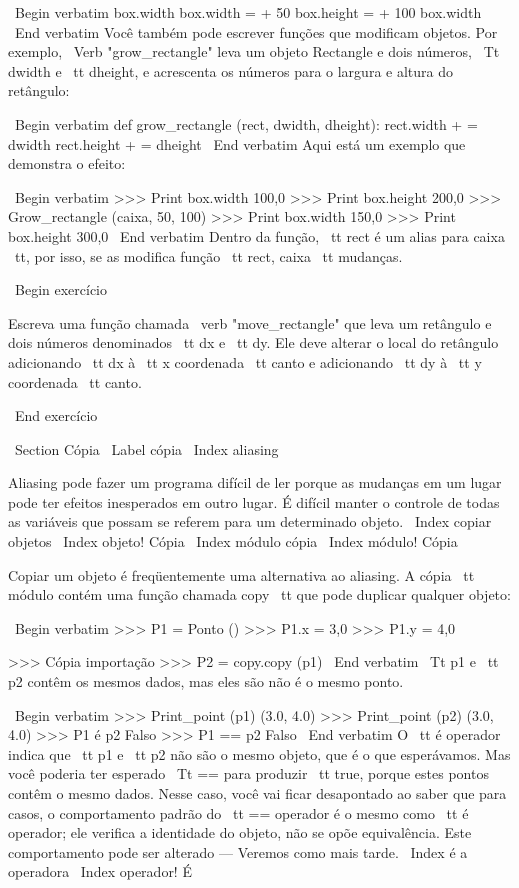 \documentclass[10pt]{book}
\begin{document}
{{{{{{{{{{{{{\ Begin {verbatim}
box.width box.width = + 50
box.height = + 100 box.width
\ End {verbatim}
%
Você também pode escrever funções que modificam objetos. Por exemplo,
\ Verb "grow_rectangle" leva um objeto Rectangle e dois números,
{\ Tt dwidth} e {\ tt dheight}, e acrescenta os números para o
largura e altura do retângulo:

\ Begin {verbatim}
def grow_rectangle (rect, dwidth, dheight):
    rect.width + = dwidth
    rect.height + = dheight
\ End {verbatim}
%
Aqui está um exemplo que demonstra o efeito:

\ Begin {verbatim}
>>> Print box.width
100,0
>>> Print box.height
200,0
>>> Grow_rectangle (caixa, 50, 100)
>>> Print box.width
150,0
>>> Print box.height
300,0
\ End {verbatim}
%
Dentro da função, {\ tt rect} é um
alias para {caixa \ tt}, por isso, se as modifica função {\ tt rect}, 
{caixa \ tt} mudanças.

\ Begin {} exercício

Escreva uma função chamada \ verb "move_rectangle" que leva
um retângulo e dois números denominados {\ tt dx} e {\ tt dy}. Ele
deve alterar o local do retângulo adicionando {\ tt dx}
à {\ tt x} coordenada {\ tt canto} e adicionando {\ tt dy}
à {\ tt y} coordenada {\ tt canto}.

\ End {} exercício


\ Section {Cópia}
\ Label {cópia}
\ Index {aliasing}

Aliasing pode fazer um programa difícil de ler porque as mudanças
em um lugar pode ter efeitos inesperados em outro lugar.
É difícil manter o controle de todas as variáveis ​​que possam se referem
para um determinado objeto.
\ Index {copiar objetos}
\ Index {objeto! Cópia}
\ Index {módulo cópia}
\ Index {módulo! Cópia}

Copiar um objeto é freqüentemente uma alternativa ao aliasing.
A cópia {\ tt} módulo contém uma função chamada {copy \ tt} que
pode duplicar qualquer objeto:

\ Begin {verbatim}
>>> P1 = Ponto ()
>>> P1.x = 3,0
>>> P1.y = 4,0

>>> Cópia importação
>>> P2 = copy.copy (p1)
\ End {verbatim}
%
{\ Tt p1} e {\ tt p2} contêm os mesmos dados, mas eles são
não é o mesmo ponto.

\ Begin {verbatim}
>>> Print_point (p1)
(3.0, 4.0)
>>> Print_point (p2)
(3.0, 4.0)
>>> P1 é p2
Falso
>>> P1 == p2
Falso
\ End {verbatim}
%
O {\ tt é} operador indica que {\ tt p1} e {\ tt p2} não são o
mesmo objeto, que é o que esperávamos. Mas você poderia ter esperado
{\ Tt ==} para produzir {\ tt true}, porque estes pontos contêm o mesmo
dados. Nesse caso, você vai ficar desapontado ao saber que para
casos, o comportamento padrão do {\ tt ==} operador é o mesmo
como {\ tt é} operador; ele verifica a identidade do objeto, não se opõe
equivalência. Este comportamento pode ser alterado --- Veremos como mais tarde.
\ Index {} é a operadora
\ Index {operador! É}

}}}}}}}}}}}}}
\end{document}
